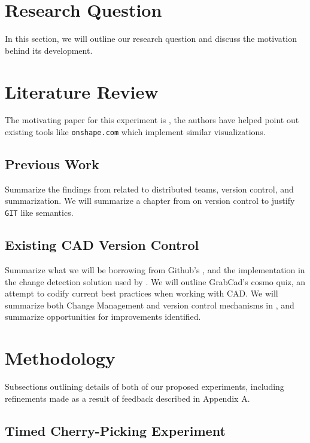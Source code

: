 \documentclass[sigconf,authorversion,nonacm]{acmart}
\begin{document}
\section{Research Question}

In this section, we will outline our research question and discuss the motivation behind its development.
\section{Literature Review}

The motivating paper for this experiment is \citet{cheng2023age}, the authors have helped point out existing tools like \texttt{onshape.com} which implement similar visualizations.

\subsection{Previous Work}
Summarize the findings from \citet{cheng2023age} related to distributed teams, version control, and summarization.
We will summarize a chapter from \citet{Frazelle_2021} on version control to justify \texttt{GIT} like semantics.

\subsection{Existing CAD Version Control}
Summarize what we will be borrowing from Github's \citet{github_blog_2013}, and the implementation in the change detection solution used by \citet{3drepo_blog}.
We will outline GrabCad's cosmo quiz\cite{revisions_2014}, an attempt to codify current best practices when working with CAD.
We will summarize both Change Management and version control mechanisms in \citet{Bricogne_Rivest_Troussier_Eynard_2012}, and summarize opportunities for improvements identified.

\section{Methodology}

Subsections outlining details of both of our proposed experiments, including refinements made as a result of feedback described in Appendix A.

\subsection{Timed Cherry-Picking Experiment}
\end{document}
